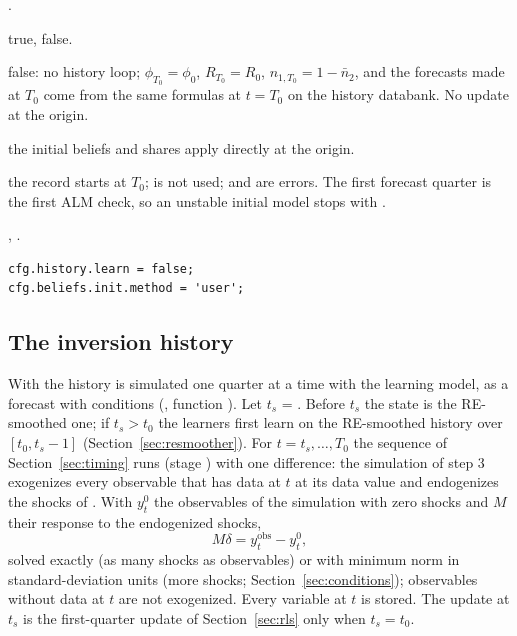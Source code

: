 \documentclass[11pt,a4paper]{article}
\DeclareRobustCommand{\codem}[1]{\texttt{\detokenize{#1}}}
\newenvironment{optspec}%
  {\begin{description}[style=sameline,leftmargin=2.7cm,labelwidth=2.5cm,font=\normalfont\itshape]}%
  {\end{description}}
\begin{document}
\subsubsection{\texorpdfstring{\codem{history.learn}}{history.learn}}\label{opt:history-learn}
\begin{optspec}
  \item[Default] .
  \item[Values] true, false.
  \item[Math] false: no history loop; $\phi_{T_0} = \phi_0$, $R_{T_0} = R_0$, $n_{1,T_0} =
        1 - \bar n_2$, and the forecasts made at $T_0$ come from the same formulas at $t = T_0$ on
        the history databank. No update at the origin.
  \item[Assumptions] the initial beliefs and shares apply directly at the origin.
  \item[Interactions] the record starts at $T_0$;  is not used;
         and  are errors. The first forecast quarter is the
        first ALM check, so an unstable initial model stops with
        .
  \item[Code] , .
  \item[Example]
\begin{lstlisting}
cfg.history.learn = false;
cfg.beliefs.init.method = 'user';
\end{lstlisting}
\end{optspec}

\subsection{The inversion history}\label{sec:inversion}

With  the history is simulated one quarter at a time with the
learning model, as a forecast with conditions (, function
). Let $t_s$ = . Before $t_s$ the state is the
RE-smoothed one; if $t_s > t_0$ the learners first learn on the RE-smoothed history over
$[t_0, t_s-1]$ (Section~\ref{sec:resmoother}). For $t = t_s,\dots,T_0$ the sequence of
Section~\ref{sec:timing} runs (stage ) with one difference: the simulation of
step 3 exogenizes every observable that has data at $t$ at its data value and endogenizes the
shocks of . With $y^0_t$ the observables of the simulation with
zero shocks and $M$ their response to the endogenized shocks,
\begin{equation}\label{eq:inversion}
  M\delta = y^{\text{obs}}_t - y^0_t,
\end{equation}
solved exactly (as many shocks as observables) or with minimum norm in standard-deviation units
(more shocks; Section~\ref{sec:conditions}); observables without data at $t$ are not exogenized.
Every variable at $t$ is stored. The update at $t_s$ is the first-quarter update of
Section~\ref{sec:rls} only when $t_s = t_0$.
\end{document}
